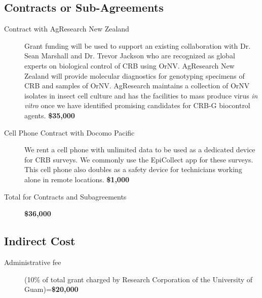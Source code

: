 \documentclass[14pt,english,letterpaper]{scrartcl}
\begin{document}
\subsection{Contracts or Sub-Agreements} 


\begin{description}
	
	\item[Contract with AgResearch New Zealand] Grant funding will be used to support an existing collaboration with Dr. Sean Marshall and Dr. Trevor Jackson who are recognized as global experts on biological control of CRB using OrNV. AgResearch New Zealand will provide molecular diagnostics for genotyping specimens of CRB and samples of OrNV. AgResearch maintains a collection of OrNV isolates in insect cell culture and has the facilities to mass produce virus \textit{in vitro} once we have identified promising candidates for CRB-G biocontrol agents. \textbf{\$35,000}
	
	\item[Cell Phone Contract with Docomo Pacific] We rent a cell phone with unlimited data to be used as a dedicated device for CRB surveys. We commonly use the EpiCollect app for these surveys.  This cell phone also doubles as a safety device for technicians working alone in remote locations. \textbf{\$1,000}
	
	\item[Total for Contracts and Subagreements] \textbf{\$36,000}
	
\end{description}


\subsection{Indirect Cost} 

\begin{description}
	
	\item[Administrative fee] (10\% of total grant charged by Research Corporation of the University of Guam)=\textbf{\$20,000}
	
\end{description}
\end{document}
